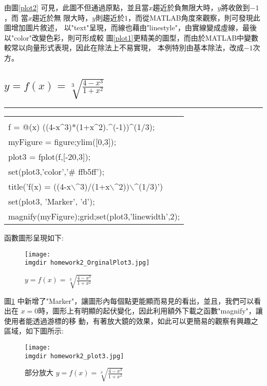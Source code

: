 		由圖\ref{plot2} 可見，此圖不但通過原點，並且當$x$趨近於負無限大時，$y$將收斂到$-1$，而			當$x$趨近於無	限大時，$y$則趨近於$1$，而從MATLAB角度來觀察，則可發現此圖增加圖片敘述，				以"text"呈現，而線也藉由"linestyle"，由實線變成虛線，最後以"color"改變色彩，則可形成較			圖\ref{plot1}更精美的圖型，而由於MATLAB中變數較常以向量形式表現，因此在除法上不易實現，			本例特別由基本除法，改成$-1$次方。
		\newpage
		\subsection{$y=f(x)=\sqrt[3]{\frac{4-x^{3}}{1+x^{2}}}$}
		\rule{\textwidth}{0.2pt}
		\begin{center}\colorbox{slight}{
				\begin{tabular}{p{}}
					\MJHmarker{\textbf{MATLAB語法 :}}\\					
					f = @(x) ((4-x$\^$3)*(1+x$\^$2).$\^$(-1))$\^$(1/3);\\
					myFigure = figure;ylim([0,3]);\\
					plot3 = fplot(f,[-20,3]);\\	
					set(plot3,'color','\# ffb5ff');\\					
					title('f(x) = ((4-x$\backslash\^$3)/(1+x$\backslash\^$2))$								\backslash\^$(1/3)')\\
					set(plot3, 'Marker', 'd');\\
					magnify(myFigure);grid;set(plot3,'linewidth',2);\\
				\end{tabular}
			}
			\end{center}			
		\bigskip
		函數圖形呈現如下:	
		\begin{figure}[H]	
		 	 \centering	 			 	 
   			 \texttt{[image: \\imgdir homework2\_OrginalPlot3.jpg]} 
   			 \caption{$y=f(x)=\sqrt[3]{\frac{4-x^{3}}{1+x^{2}}}$}   		
   			 \label{plot3}   			 		 
		\end{figure}
		\bigskip	
		圖\ref{plot3} 中新增了"Marker"，讓圖形內每個點更能顯而易見的看出，並且，我們可以看出在			$x=0$時，圖形上有明顯的起伏變化，因此利用額外下載之函數"magnify"，讓使用者能透過游標的移			動，有著放大鏡的效果，如此可以更簡易的觀察有興趣之區域，如下圖所示:
		\begin{figure}[H]	
		 	 \centering	 			 	 
   			 \texttt{[image: \\imgdir homework2\_plot3.jpg]} 
   			 \caption{部分放大 $y=f(x)=\sqrt[3]{\frac{4-x^{3}}{1+x^{2}}}$}   		
   			 \label{plot3_zoom}   			 		 
		\end{figure}
		\bigskip
